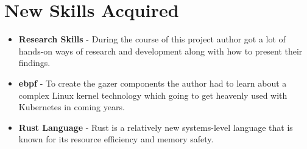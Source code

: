 \section{New Skills Acquired}

\begin{itemize}[noitemsep,nolistsep]
    \item \textbf{Research Skills} - During the course of this project author got a lot of hands-on ways of research and development along with how to present their findings.
    \item \textbf{\ac{ebpf}} - To create the \ac{gazer} components the author had to learn about a complex Linux kernel technology which going to get heavenly used with Kubernetes in coming years.
    \item \textbf{Rust Language} - Rust is a relatively new systems-level language that is known for its resource efficiency and memory safety.
\end{itemize}